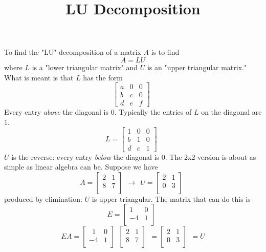 \documentclass[11pt, oneside]{article}
\title{LU Decomposition}
\date{}
\begin{document}
\maketitle
\Large


To find the "LU" decomposition of a matrix $A$ is to find
\[ A = LU \]
where $L$ is a "lower triangular matrix" and $U$ is an "upper triangular matrix."  What is meant is that $L$ has the form
\[
\begin{bmatrix} 
  a  &  0  &  0 \\ 
  b  &  c  &  0 \\
  d  &  e  &  f
\end{bmatrix} \ \ 
\]
Every entry \emph{above} the diagonal is 0.  Typically the entries of $L$ on the diagonal are $1$.
\[ L =
\begin{bmatrix} 
  1  &  0  &  0 \\ 
  b  &  1  &  0 \\
  d  &  e  &  1
\end{bmatrix} \ \ 
\]
$U$ is the reverse:  every entry \emph{below} the diagonal is 0.
The 2x2 version is about as simple as linear algebra can be.  Suppose we have
\[ 
A  =
\begin{bmatrix} 
  2  &  1  \\ 
  8  &  7  \\
\end{bmatrix}  \ \ 
\rightarrow \ \ 
U = 
\begin{bmatrix} 
  2  &  1  \\ 
  0  &  3  \\
\end{bmatrix}  \ \ 
\]
produced by elimination.  $U$ is upper triangular.  The matrix that can do this is
\[ 
E  =
\begin{bmatrix} 
  1  &  0  \\ 
  -4  &  1  \\
\end{bmatrix}  \ \ 
\]
\[ 
E A =
\begin{bmatrix} 
\ \   1  &  0  \\ 
  -4  &  1  \\
\end{bmatrix}  \ \ 
\begin{bmatrix} 
  2  &  1  \\ 
  8  &  7  \\
\end{bmatrix}  \ \ 
=
\begin{bmatrix} 
  2  &  1  \\ 
  0  &  3  \\
\end{bmatrix}  \ \ 
=
U
\]
\end{document}
